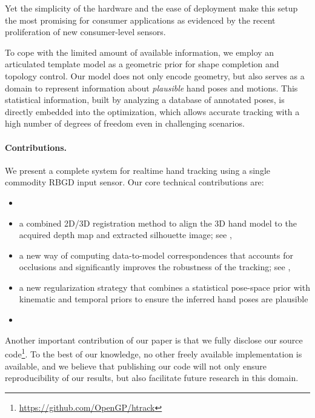 Yet the simplicity of the hardware and the ease of deployment make this setup the most promising for consumer applications as evidenced by the recent proliferation of new consumer-level sensors.

To cope with the limited amount of available information, we employ an articulated template model as a geometric prior for shape completion and topology control. Our model does not only encode geometry, but also serves as a domain to represent information about \emph{plausible} hand poses and motions. This statistical information, built by analyzing a database of annotated poses, is directly embedded into the optimization, which
allows accurate tracking with a high number of degrees of freedom even in challenging scenarios.

\paragraph*{Contributions.}
% 
We present a complete system for realtime hand tracking using a single commodity RBGD input sensor. Our core technical contributions are:
% 
\begin {itemize}
\item {}
\item a combined 2D/3D registration method to align the 3D hand model to the acquired depth map and extracted silhouette image; see ,
\item a new way of computing data-to-model correspondences that accounts for occlusions and significantly improves the robustness of the tracking; see ,
\item a new regularization strategy that combines a statistical pose-space prior with kinematic and temporal priors to  ensure the inferred hand poses are plausible
\item {}
\end{itemize}

Another important contribution of our paper is that we fully disclose our source code\footnote{\url{https://github.com/OpenGP/htrack}}. To the best of our knowledge, no other freely available implementation is available, and we believe that publishing our code will not only ensure reproducibility of our results, but also facilitate future research in this domain.

